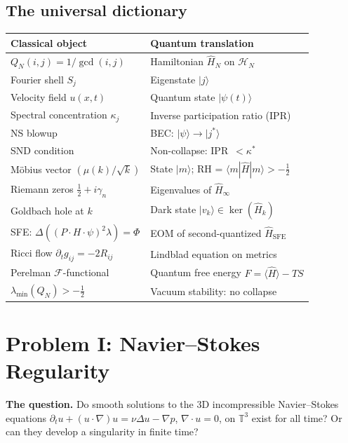 \documentclass[12pt]{article}
\newcommand{\ket}[1]{|{#1}\rangle}
\newcommand{\bra}[1]{\langle{#1}|}
\newcommand{\Hil}{\mathcal{H}}
\newcommand{\half}{\tfrac{1}{2}}
\newcommand{\T}{\mathbb{T}}
\begin{document}
\subsection{The universal dictionary}

\begin{center}
\renewcommand{\arraystretch}{1.5}
\small
\begin{tabular}{@{}p{5.0cm}p{7.8cm}@{}}
\toprule
\textbf{Classical object} & \textbf{Quantum translation} \\
\midrule
$Q_N(i,j) = 1/\gcd(i,j)$ &
  Hamiltonian $\hat{H}_N$ on $\Hil_N$ \\
Fourier shell $S_j$ & Eigenstate $\ket{j}$ \\
Velocity field $u(x,t)$ & Quantum state $\ket{\psi(t)}$ \\
Spectral concentration $\kappa_j$ & Inverse participation ratio (IPR) \\
NS blowup & BEC: $\ket{\psi}\to\ket{j^*}$ \\
SND condition & Non-collapse: IPR~$<\kappa^*$ \\
M\"{o}bius vector $(\mu(k)/\sqrt{k})$ & State $\ket{m}$; RH = $\bra{m}\hat{H}\ket{m}>-\half$ \\
Riemann zeros $\half+i\gamma_n$ & Eigenvalues of $\hat{H}_\infty$ \\
Goldbach hole at $k$ & Dark state $\ket{v_k}\in\ker(\hat{H}_k)$ \\
SFE: $\Delta((P\cdot H\cdot\psi)^2\lambda)=\Phi$ &
  EOM of second-quantized $\hat{H}_{\mathrm{SFE}}$ \\
Ricci flow $\partial_t g_{ij}=-2R_{ij}$ & Lindblad equation on metrics \\
Perelman $\mathcal{F}$-functional & Quantum free energy $F=\langle\hat{H}\rangle-TS$ \\
$\lambda_{\min}(Q_N)>-\half$ & Vacuum stability: no collapse \\
\bottomrule
\end{tabular}
\end{center}

\section{Problem I: Navier--Stokes Regularity}
\label{sec:ns}

\textbf{The question.}
Do smooth solutions to the 3D incompressible Navier--Stokes equations
$\partial_t u + (u\cdot\nabla)u = \nu\Delta u - \nabla p$,
$\nabla\cdot u = 0$,
on $\T^3$ exist for all time?
Or can they develop a singularity in finite time?
\end{document}

